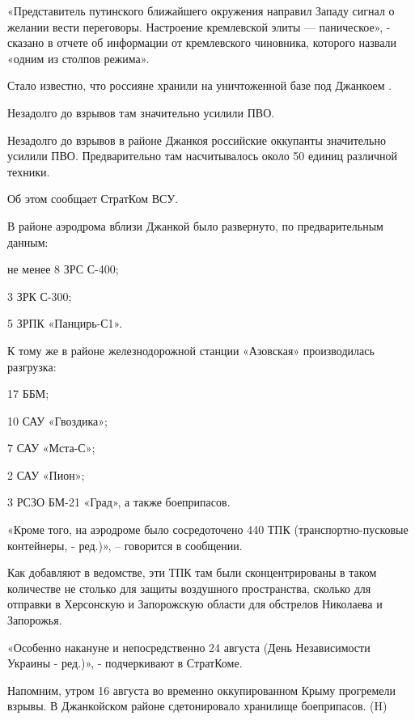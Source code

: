 «Представитель путинского ближайшего окружения направил Западу сигнал о желании вести переговоры. Настроение кремлевской элиты — паническое», - сказано в отчете об информации от кремлевского чиновника, которого назвали «одним из столпов режима».


Стало известно, что россияне хранили на уничтоженной базе под Джанкоем .

Незадолго до взрывов там значительно усилили ПВО.

Незадолго до взрывов в районе Джанкоя российские оккупанты значительно усилили ПВО. Предварительно там насчитывалось около 50 единиц различной техники.

Об этом сообщает СтратКом ВСУ.

В районе аэродрома вблизи Джанкой было развернуто, по предварительным данным:

не менее 8 ЗРС С-400;

3 ЗРК С-300;

5 ЗРПК «Панцирь-С1».

К тому же в районе железнодорожной станции «Азовская» производилась разгрузка:

17 ББМ;

10 САУ «Гвоздика»;

7 САУ «Мста-С»;

2 САУ «Пион»;

3 РСЗО БМ-21 «Град», а также боеприпасов.

«Кроме того, на аэродроме было сосредоточено 440 ТПК (транспортно-пусковые контейнеры, - ред.)», – говорится в сообщении.

Как добавляют в ведомстве, эти ТПК там были сконцентрированы в таком количестве не столько для защиты воздушного пространства, сколько для отправки в Херсонскую и Запорожскую области для обстрелов Николаева и Запорожья.

«Особенно накануне и непосредственно 24 августа (День Независимости Украины - ред.)», - подчеркивают в СтратКоме.

Напомним, утром 16 августа во временно оккупированном Крыму прогремели взрывы. В Джанкойском районе сдетонировало хранилище боеприпасов. 
(H)

